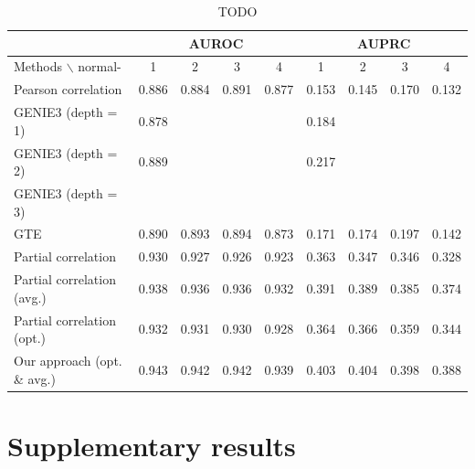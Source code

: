 \documentclass[wcp]{jmlr}
\begin{document}
\begin{table}
\small
\centering
\begin{tabular}{@{}l *{8}{c}@{}}
  & \multicolumn{4}{c}{AUROC} & \multicolumn{4}{c}{AUPRC} \\
\hline \hline
Methods $\backslash$ normal- & 1 & 2 & 3 & 4 & 1 & 2 & 3 & 4 \\
\hline \hline
Pearson correlation    & 0.886 & 0.884 & 0.891 & 0.877 & 0.153 & 0.145 & 0.170 & 0.132 \\
GENIE3 (depth = 1)     & 0.878 & & & & 0.184 & & & \\
GENIE3 (depth = 2)     & 0.889 & & & & 0.217 & & & \\
GENIE3 (depth = 3)     & & & & & & & & \\
GTE                    & 0.890 & 0.893 & 0.894 & 0.873 & 0.171 & 0.174 & 0.197 & 0.142 \\
Partial correlation    & 0.930 &  0.927 &  0.926 &  0.923& 0.363  & 0.347 &  0.346 & 0.328 \\
Partial correlation (avg.) & 0.938 & 0.936 & 0.936 & 0.932& 0.391 & 0.389 & 0.385 & 0.374\\
Partial correlation (opt.) & 0.932 & 0.931 & 0.930 & 0.928 & 0.364 & 0.366 & 0.359 & 0.344 \\
Our approach (opt. \& avg.)    & 0.943 & 0.942 & 0.942 & 0.939 & 0.403 & 0.404 & 0.398 & 0.388 \\
\end{tabular}
\caption{TODO}
\label{tab:tab1}
\end{table}


\section{Supplementary results}
\end{document}
